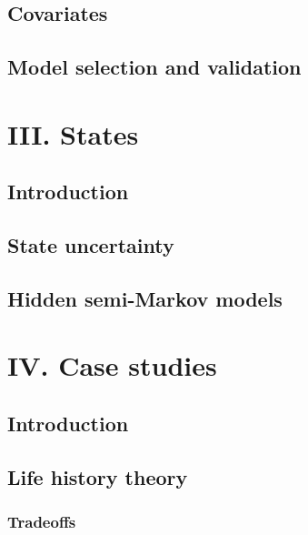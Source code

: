\documentclass[
  12pt,
]{krantz}
\begin{document}
\hypertarget{covariates}{%
\chapter{Covariates}\label{covariates}}

\hypertarget{model-selection}{%
\chapter{Model selection and validation}\label{model-selection}}

\hypertarget{part-iii.-states}{%
\part{III. States}\label{part-iii.-states}}

\hypertarget{introduction-7}{%
\chapter*{Introduction}\label{introduction-7}}


\hypertarget{uncertainty}{%
\chapter{State uncertainty}\label{uncertainty}}

\hypertarget{hsmm}{%
\chapter{Hidden semi-Markov models}\label{hsmm}}

\hypertarget{part-iv.-case-studies}{%
\part{IV. Case studies}\label{part-iv.-case-studies}}

\hypertarget{introduction-8}{%
\chapter*{Introduction}\label{introduction-8}}


\hypertarget{tradeoffs}{%
\chapter{Life history theory}\label{tradeoffs}}

\hypertarget{tradeoffs-1}{%
\section{Tradeoffs}\label{tradeoffs-1}}
\end{document}
